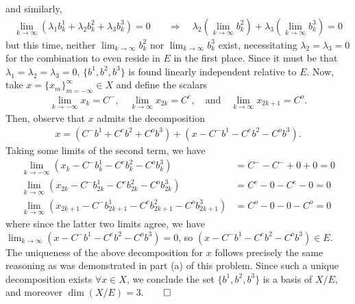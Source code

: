 \documentclass[10pt]{article}
\newcommand{\1}[1]{\mathbbm{1}_{#1}}
\begin{document}
    and similarly,
    \begin{align*}
        \lim_{k\rightarrow\infty}(\lambda_1b^1_k+\lambda_2b^2_k+\lambda_3b^3_k)=0\quad&\Rightarrow\quad\lambda_2(\lim_{k\rightarrow \infty}b^2_k)+\lambda_3(\lim_{k\rightarrow \infty}b^3_k)=0
    \end{align*}
    but this time, neither $\lim_{k\rightarrow\infty}b^2_k$ nor $\lim_{k\rightarrow\infty}b^3_k$ exist, necessitating $\lambda_2=\lambda_3=0$ for the combination to even reside in $E$ in the first place.
    Since it must be that $\lambda_1=\lambda_2=\lambda_3=0$, $\{b^1,b^2,b^3\}$ is found linearly independent relative to $E$. Now, take $x=\{x_m\}_{m=-\infty}^\infty\in X$ and define the scalars
    \begin{align*}
        \lim_{k\rightarrow-\infty}x_k=C^-,\quad\lim_{k\rightarrow\infty}x_{2k}=C^e,\quad\text{and}\quad\lim_{k\rightarrow\infty}x_{2k+1}=C^o.
    \end{align*}
    Then, observe that $x$ admits the decomposition
    \begin{align*}
        x=(C^-b^1+C^eb^2+C^ob^3)+(x-C^-b^1-C^eb^2-C^ob^3).
    \end{align*}
    Taking some limits of the second term, we have
    \begin{align*}
        \lim_{k\rightarrow-\infty}(x_k-C^-b^1_k-C^eb^2_k-C^ob^3_k)&=C^--C^-+0+0=0\\
        \lim_{k\rightarrow\infty}(x_{2k}-C^-b^1_{2k}-C^eb^2_{2k}-C^ob^3_{2k})&=C^e-0-C^e-0=0\\
        \lim_{k\rightarrow\infty}(x_{2k+1}-C^-b^1_{2k+1}-C^eb^2_{2k+1}-C^ob^3_{2k+1})&=C^o-0-0-C^o=0
    \end{align*}
    where since the latter two limits agree, we have $\lim_{k\rightarrow\infty}(x-C^-b^1-C^eb^2-C^ob^3)=0$, so $(x-C^-b^1-C^eb^2-C^ob^3)\in E$. 
    The uniqueness of the above decomposition for $x$ follows precisely the same reasoning as was demonstrated in part (a) of this problem.
    Since such a unique decomposition exists $\forall x\in X$, we conclude the set $\{b^1,b^2,b^3\}$ is a basis of $X/E$, and moreover $\dim(X/E)=3$.\hfill{$\qed$}
\end{document}

